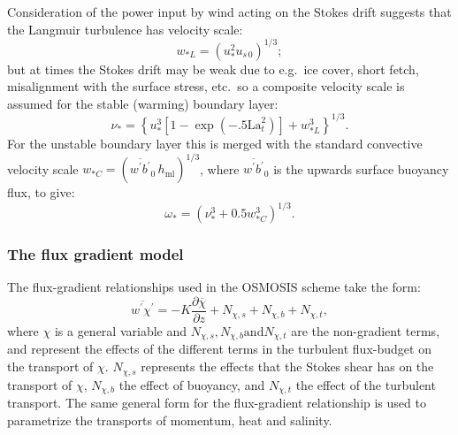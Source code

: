 \documentclass[../main/NEMO_manual]{subfiles}
\begin{document}
Consideration of the power input by wind acting on the Stokes drift suggests that the Langmuir turbulence has velocity scale:
\begin{equation}\label{eq:w_La}
w_{*L}= \left(u_*^2 u_{s\,0}\right)^{1/3};
\end{equation}
but at times the Stokes drift may be weak due to e.g.\ ice cover, short fetch, misalignment with the surface stress, etc.\ so  a composite velocity scale is assumed for the stable (warming) boundary layer:
\begin{equation}\label{eq:composite-nu}
  \nu_{\ast}= \left\{ u_*^3 \left[1-\exp(-.5 \mathrm{La}_t^2)\right]+w_{*L}^3\right\}^{1/3}.
\end{equation}
For the unstable boundary layer this is merged with the standard convective velocity scale $w_{*C}=\left(\overline{w^\prime b^\prime}_0 \,h_\mathrm{ml}\right)^{1/3}$, where $\overline{w^\prime b^\prime}_0$ is the upwards surface buoyancy flux, to give:
\begin{equation}\label{eq:vel-scale-unstable}
\omega_* = \left(\nu_*^3 + 0.5 w_{*C}^3\right)^{1/3}.
\end{equation}

\subsubsection{The flux gradient model}
The flux-gradient relationships used in the OSMOSIS scheme take the form:
%
\begin{equation}\label{eq:flux-grad-gen}
\overline{w^\prime\chi^\prime}=-K\frac{\partial\overline{\chi}}{\partial z} + N_{\chi,s} +N_{\chi,b} +N_{\chi,t},
\end{equation}
%
where $\chi$ is a general variable and $N_{\chi,s}, N_{\chi,b} \mathrm{and} N_{\chi,t}$  are the non-gradient terms, and represent the effects of the different terms in the turbulent flux-budget on the transport of $\chi$. $N_{\chi,s}$ represents the effects that the Stokes shear has on the transport of $\chi$, $N_{\chi,b}$  the effect of buoyancy, and $N_{\chi,t}$ the effect of the turbulent transport.  The same general form for the flux-gradient relationship is used to parametrize the transports of momentum, heat and salinity.
\end{document}
